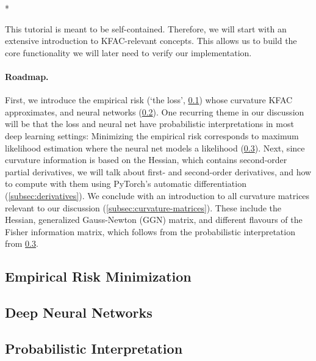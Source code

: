 \switchcolumn[1]*
\switchcolumn[0]

This tutorial is meant to be self-contained.
Therefore, we will start with an extensive introduction to KFAC-relevant concepts.
This allows us to build the core functionality we will later need to verify our implementation.

\paragraph{Roadmap.} First, we introduce the empirical risk (`the loss', \cref{subsec:empirical-risk-minimization}) whose curvature KFAC approximates, and neural networks (\cref{subsec:deep-neural-networks}).
One recurring theme in our discussion will be that the loss and neural net have probabilistic interpretations in most deep learning settings: Minimizing the empirical risk corresponds to maximum likelihood estimation where the neural net models a likelihood (\cref{subsec:probabilistic-interpretation}).
Next, since curvature information is based on the Hessian, which contains second-order partial derivatives, we will talk about first- and second-order derivatives, and how to compute with them using PyTorch's automatic differentiation (\cref{subsec:derivatives}).
We conclude with an introduction to all curvature matrices relevant to our discussion (\cref{subsec:curvature-matrices}).
These include the Hessian, generalized Gauss-Newton (GGN) matrix, and different flavours of the Fisher information matrix, which follows from the probabilistic interpretation from \cref{subsec:probabilistic-interpretation}.

\subsection{Empirical Risk Minimization}\label{subsec:empirical-risk-minimization}


\switchcolumn[1]
\switchcolumn[0]
\subsection{Deep Neural Networks}\label{subsec:deep-neural-networks}


\subsection{Probabilistic Interpretation}\label{subsec:probabilistic-interpretation}


